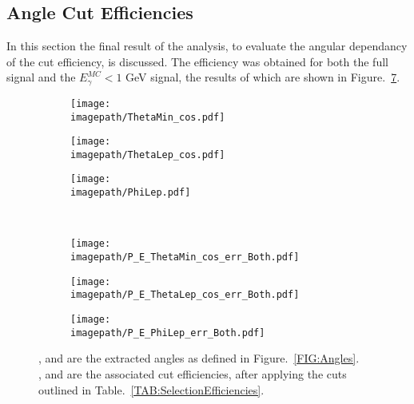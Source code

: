 \subsection{Angle Cut Efficiencies}
\label{SUBSEC:AngleCutEfficiencies}
In this section the final result of the analysis, to evaluate the angular dependancy of the cut efficiency, is discussed. The efficiency was obtained for both the full signal and the ${E}_{\gamma}^{MC} < 1$ GeV signal, the results of which are shown in Figure.~\ref{FIG:AngleEfficiencies}.
\\
\begin{figure}
    \begin{subfigure}[t]{0.32\textwidth}
        \texttt{[image: \\imagepath/ThetaMin\_cos.pdf]}
        \caption{}
        \label{SUBFIG:ThetaMin}
    \end{subfigure}
    \begin{subfigure}[t]{0.32\textwidth}
        \texttt{[image: \\imagepath/ThetaLep\_cos.pdf]}
        \caption{}
        \label{SUBFIG:ThetaLep}
    \end{subfigure}
    \begin{subfigure}[t]{0.32\textwidth}
        \texttt{[image: \\imagepath/PhiLep.pdf]}
        \caption{}
        \label{SUBFIG:PhiLep}
    \end{subfigure}\\
    \begin{subfigure}[t]{0.32\textwidth}
        \texttt{[image: \\imagepath/P\_E\_ThetaMin\_cos\_err\_Both.pdf]}
        \caption{}
        \label{SUBFIG:ThetaMinError}
    \end{subfigure}
    \begin{subfigure}[t]{0.32\textwidth}
        \texttt{[image: \\imagepath/P\_E\_ThetaLep\_cos\_err\_Both.pdf]}
        \caption{}
        \label{SUBFIG:ThetaLepError}
    \end{subfigure}
    \begin{subfigure}[t]{0.32\textwidth}
        \texttt{[image: \\imagepath/P\_E\_PhiLep\_err\_Both.pdf]}
        \caption{}
        \label{SUBFIG:PhiLepError}
    \end{subfigure}
    \caption{
    ,  and  are the extracted angles as defined in Figure.~\ref{FIG:Angles}. \\
    ,  and  are the associated cut efficiencies, after applying the cuts outlined in Table.~\ref{TAB:SelectionEfficiencies}.
    }
    \label{FIG:AngleEfficiencies}
\end{figure}

